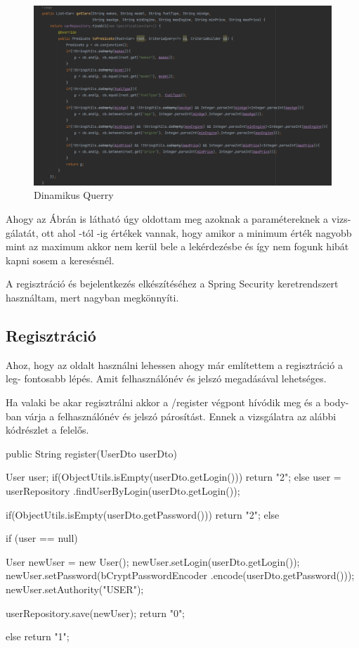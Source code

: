 \begin{figure}[h]
\centering
\includegraphics[scale=0.6]{images/Dinamikus_Querry.png}
\caption{Dinamikus Querry}
\label{fig:Dinamikus_Querry}
\end{figure}

Ahogy az Ábrán is látható úgy oldottam meg azoknak a paramétereknek a vizs-
gálatát, ott ahol -tól -ig értékek vannak, hogy amikor a minimum érték nagyobb mint az maximum akkor nem kerül bele a lekérdezésbe és így nem fogunk hibát kapni sosem a keresésnél.

A regisztráció és bejelentkezés elkészítéséhez a Spring Security keretrendszert használtam, mert nagyban megkönnyíti.

\subsection{Regisztráció}
Ahoz, hogy az oldalt használni lehessen ahogy már említettem a regisztráció a leg-
fontosabb lépés. Amit felhasználónév és  jelszó megadásával lehetséges. 

Ha valaki be akar regisztrálni akkor a /register végpont hívódik meg és a body-ban várja a felhasználónév és jelszó párosítást. Ennek a vizsgálatra az alábbi kódrészlet a felelős.

\begin{java}
 public String register(UserDto userDto) {
        User user;
        if(ObjectUtils.isEmpty(userDto.getLogin())){
            return "2";
        }else{
           user = userRepository
           .findUserByLogin(userDto.getLogin());
        }

        if(ObjectUtils.isEmpty(userDto.getPassword())) {
            return "2";
        }
        else {
            if (user == null) {
                User newUser = new User();
                newUser.setLogin(userDto.getLogin());
                newUser.setPassword(bCryptPasswordEncoder
                        .encode(userDto.getPassword()));
                newUser.setAuthority("USER");

                userRepository.save(newUser);
                return "0";
            } else {
                return "1";
            }
        }
    }
\end{java}


